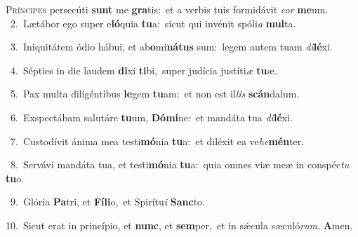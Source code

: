 \lettrine{\initial\textcolor{\initialcolor}{P}}{ríncipes} persecúti \textbf{sunt} me \textbf{gra}\-tis:~\star et a verbis tuis formidávit \textit{cor} \textbf{me}\-um.\\
{\numbfont\textcolor{\numbcolor}{~2.}}~Lætábor ego super e\-\textbf{ló}\-quia \textbf{tu}\-a:~\star sicut qui invénit spóli\textit{a} \textbf{mul}\-ta.\par
{\numbfont\textcolor{\numbcolor}{~3.}}~Iniquitátem ódio hábui, et ab\-\textbf{o}\-mi\-\textbf{ná}\-\textbf{tus} sum:~\star legem autem tuam \textit{di}\-\textbf{lé}xi.\par
{\numbfont\textcolor{\numbcolor}{~4.}}~Sépties in die laudem \textbf{di}\-xi \textbf{ti}\-bi,~\star super judícia justíti\textit{æ} \textbf{tu}\-æ.\par
{\numbfont\textcolor{\numbcolor}{~5.}}~Pax multa diligéntibus \textbf{le}\-gem \textbf{tu}\-am:~\star et non est il\textit{lis} \textbf{scán}\-dalum.\par
{\numbfont\textcolor{\numbcolor}{~6.}}~Exspectábam salutáre \textbf{tu}\-um, \textbf{Dó}\-\textbf{mi}ne:~\star et mandáta tua \textit{di}\-\textbf{lé}xi.\par
{\numbfont\textcolor{\numbcolor}{~7.}}~Custodívit ánima mea testi\-\textbf{mó}\-nia \textbf{tu}\-a:~\star et diléxit ea ve\-\textit{he}\-\textbf{mén}ter.\par
{\numbfont\textcolor{\numbcolor}{~8.}}~Servávi mandáta tua, et testi\-\textbf{mó}\-nia \textbf{tu}\-a:~\star quia omnes viæ meæ in conspéc\textit{tu} \textbf{tu}\-o.\par
{\numbfont\textcolor{\numbcolor}{~9.}}~Glória \textbf{Pa}\-tri, et \textbf{Fí}\-\textbf{li}o,~\star et Spirítu\textit{i} \textbf{Sanc}\-to.\par
{\numbfont\textcolor{\numbcolor}{10.}}~Sicut erat in princípio, et \textbf{nunc}\-, et \textbf{sem}\-per,~\star et in sǽcula sæculó\-\textit{rum}\-. \textbf{A}\-men.\par
